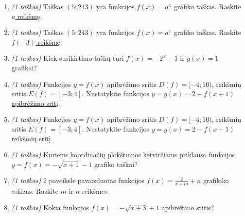 \documentclass[a4paper]{article}
\begin{document}
\begin{enumerate}
      \item \textit{(1 taškas)} Taškas $(5; 243)$ yra funkcijos $f(x)=a^x$
            grafiko taškas. Raskite \underline{$a$ reikšmę}.
            \vspace{7mm}

      \item \textit{(1 taškas)} Taškas $(5; 243)$ yra funkcijos $f(x)=a^x$
            grafiko taškas. Raskite \underline{$f(-3)$ reikšmę}.
            \vspace{7mm}

      \item \textit{(1 taškas)} Kiek susikirtimo taškų turi $f(x)=-2^x-1$
            ir
            $g(x)=1$ grafikai?
            \vspace{7mm}

      \item \textit{(1 taškas)} Funkcijos $y=f(x)$ apibrėžimo sritis $D(f)=[-4;
                  10)$, reikšmių sritis $E(f)=[-3;4]$. Nustatykite funkcijos
            $y=g(x)=2-f(x+1)$
            \underline{apibrėžimo sritį}.
            \vspace{7mm}

      \item \textit{(1 taškas)} Funkcijos $y=f(x)$ apibrėžimo sritis $D(f)=[-4;
                  10)$, reikšmių sritis $E(f)=[-3;4]$. Nustatykite funkcijos
            $y=g(x)=2-f(x+1)$
            \underline{reikšmių sritį}.
            \vspace{7mm}

      \item \textit{(1 taškas)} Kuriems koordinačių plokštumos ketvirčiams
            priklauso funkcijos $y=f(x)=-\sqrt{x+1}-1$ grafiko taškai?
            \vspace{7mm}

      \item \textit{(1 taškas)} 2 paveiksle pavaizduotas funkcijos
            $f(x)=\frac{2}{x+m}+n$ grafikiko eskizas. Raskite $m$ ir $n$
            reikšmes.
            \vspace{7mm}

      \item \textit{(1 taškas)} Kokia funkcijos $f(x)=-\sqrt{x+3}+1$ apibrėžimo
            sritis?
            \vspace{10mm}

            \begin{figure}[!htpb]
                  \centering
                  

\end{figure}
\end{enumerate}
\end{document}
